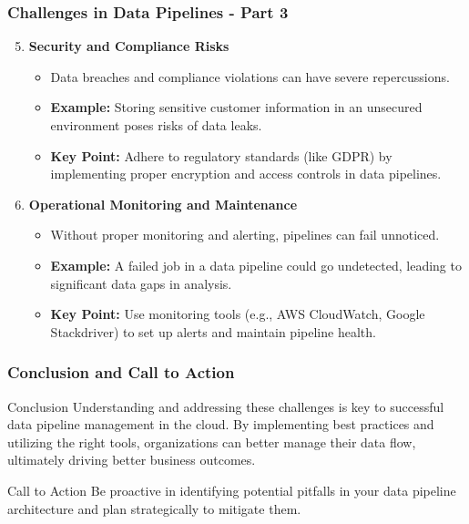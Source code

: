 \documentclass[aspectratio=169]{beamer}
\begin{document}
\begin{frame}[fragile]
  \frametitle{Challenges in Data Pipelines - Part 3}
  \begin{enumerate}
    \setcounter{enumi}{4} %
    
    \item \textbf{Security and Compliance Risks}
      \begin{itemize}
        \item Data breaches and compliance violations can have severe repercussions.
        \item \textbf{Example:} Storing sensitive customer information in an unsecured environment poses risks of data leaks.
        \item \textbf{Key Point:} Adhere to regulatory standards (like GDPR) by implementing proper encryption and access controls in data pipelines.
      \end{itemize}
    
    \item \textbf{Operational Monitoring and Maintenance}
      \begin{itemize}
        \item Without proper monitoring and alerting, pipelines can fail unnoticed.
        \item \textbf{Example:} A failed job in a data pipeline could go undetected, leading to significant data gaps in analysis.
        \item \textbf{Key Point:} Use monitoring tools (e.g., AWS CloudWatch, Google Stackdriver) to set up alerts and maintain pipeline health.
      \end{itemize}
  \end{enumerate}
\end{frame}

\begin{frame}[fragile]
  \frametitle{Conclusion and Call to Action}
  \begin{block}{Conclusion}
    Understanding and addressing these challenges is key to successful data pipeline management in the cloud. By implementing best practices and utilizing the right tools, organizations can better manage their data flow, ultimately driving better business outcomes.
  \end{block}

  \begin{block}{Call to Action}
    Be proactive in identifying potential pitfalls in your data pipeline architecture and plan strategically to mitigate them.
  \end{block}
\end{frame}
\end{document}
